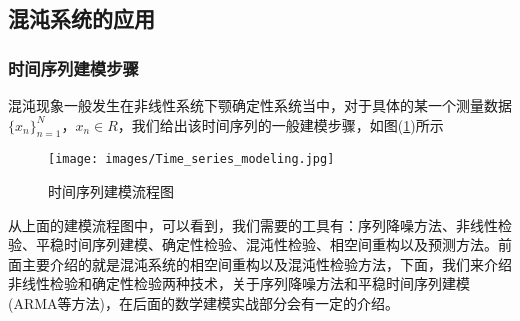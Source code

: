     \subsection{混沌系统的应用}
        \subsubsection{时间序列建模步骤}
            \par
            混沌现象一般发生在非线性系统下颚确定性系统当中，对于具体的某一个测量数据$\{x_n\}_{n = 1}^N$，$x_n \in R$，我们给出该时间序列的一般建模步骤，如图(\ref{fig:时间序列建模流程图})所示
         \begin{figure}[H]
        \centering
        \texttt{[image: images/Time\_series\_modeling.jpg]}
        \caption{时间序列建模流程图}
        \label{fig:时间序列建模流程图}
        \end{figure}
            \par
            从上面的建模流程图中，可以看到，我们需要的工具有：序列降噪方法、非线性检验、平稳时间序列建模、确定性检验、混沌性检验、相空间重构以及预测方法。前面主要介绍的就是混沌系统的相空间重构以及混沌性检验方法，下面，我们来介绍非线性检验和确定性检验两种技术，关于序列降噪方法和平稳时间序列建模(ARMA等方法)，在后面的数学建模实战部分会有一定的介绍。
